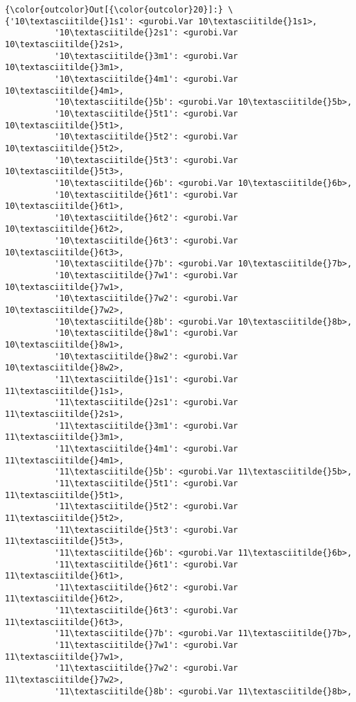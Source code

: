 \documentclass[11pt]{article}
\begin{document}
            \begin{Verbatim}[commandchars=\\\{\}]
{\color{outcolor}Out[{\color{outcolor}20}]:} \{'10\textasciitilde{}1s1': <gurobi.Var 10\textasciitilde{}1s1>,
          '10\textasciitilde{}2s1': <gurobi.Var 10\textasciitilde{}2s1>,
          '10\textasciitilde{}3m1': <gurobi.Var 10\textasciitilde{}3m1>,
          '10\textasciitilde{}4m1': <gurobi.Var 10\textasciitilde{}4m1>,
          '10\textasciitilde{}5b': <gurobi.Var 10\textasciitilde{}5b>,
          '10\textasciitilde{}5t1': <gurobi.Var 10\textasciitilde{}5t1>,
          '10\textasciitilde{}5t2': <gurobi.Var 10\textasciitilde{}5t2>,
          '10\textasciitilde{}5t3': <gurobi.Var 10\textasciitilde{}5t3>,
          '10\textasciitilde{}6b': <gurobi.Var 10\textasciitilde{}6b>,
          '10\textasciitilde{}6t1': <gurobi.Var 10\textasciitilde{}6t1>,
          '10\textasciitilde{}6t2': <gurobi.Var 10\textasciitilde{}6t2>,
          '10\textasciitilde{}6t3': <gurobi.Var 10\textasciitilde{}6t3>,
          '10\textasciitilde{}7b': <gurobi.Var 10\textasciitilde{}7b>,
          '10\textasciitilde{}7w1': <gurobi.Var 10\textasciitilde{}7w1>,
          '10\textasciitilde{}7w2': <gurobi.Var 10\textasciitilde{}7w2>,
          '10\textasciitilde{}8b': <gurobi.Var 10\textasciitilde{}8b>,
          '10\textasciitilde{}8w1': <gurobi.Var 10\textasciitilde{}8w1>,
          '10\textasciitilde{}8w2': <gurobi.Var 10\textasciitilde{}8w2>,
          '11\textasciitilde{}1s1': <gurobi.Var 11\textasciitilde{}1s1>,
          '11\textasciitilde{}2s1': <gurobi.Var 11\textasciitilde{}2s1>,
          '11\textasciitilde{}3m1': <gurobi.Var 11\textasciitilde{}3m1>,
          '11\textasciitilde{}4m1': <gurobi.Var 11\textasciitilde{}4m1>,
          '11\textasciitilde{}5b': <gurobi.Var 11\textasciitilde{}5b>,
          '11\textasciitilde{}5t1': <gurobi.Var 11\textasciitilde{}5t1>,
          '11\textasciitilde{}5t2': <gurobi.Var 11\textasciitilde{}5t2>,
          '11\textasciitilde{}5t3': <gurobi.Var 11\textasciitilde{}5t3>,
          '11\textasciitilde{}6b': <gurobi.Var 11\textasciitilde{}6b>,
          '11\textasciitilde{}6t1': <gurobi.Var 11\textasciitilde{}6t1>,
          '11\textasciitilde{}6t2': <gurobi.Var 11\textasciitilde{}6t2>,
          '11\textasciitilde{}6t3': <gurobi.Var 11\textasciitilde{}6t3>,
          '11\textasciitilde{}7b': <gurobi.Var 11\textasciitilde{}7b>,
          '11\textasciitilde{}7w1': <gurobi.Var 11\textasciitilde{}7w1>,
          '11\textasciitilde{}7w2': <gurobi.Var 11\textasciitilde{}7w2>,
          '11\textasciitilde{}8b': <gurobi.Var 11\textasciitilde{}8b>,

\end{Verbatim}
\end{document}
